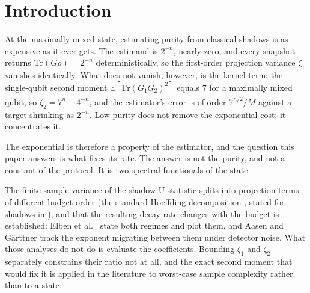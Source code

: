 \documentclass[a4paper,superscriptaddress,nofootinbib,onecolumn,nopdfoutputerror]{quantumarticle}
\begin{document}
\maketitle

\hypertarget{introduction}{%
\section{Introduction}\label{introduction}}

At the maximally mixed state, estimating purity from classical shadows is as expensive as it ever
gets. The estimand is \(2^{-n}\), nearly zero, and every snapshot returns
\(\mathrm{Tr}(G\rho) = 2^{-n}\) deterministically, so the first-order projection variance
\(\zeta_1\) vanishes identically. What does not vanish, however, is the kernel term: the
single-qubit second moment \(\mathbb{E}[\mathrm{Tr}(G_1G_2)^2]\) equals \(7\) for a maximally
mixed qubit, so
\(\zeta_2 = 7^n - 4^{-n}\), and the estimator's error is of order \(7^{n/2}/M\) against a target
shrinking as \(2^{-n}\). Low purity does not remove the exponential cost; it concentrates it.

The exponential is therefore a property of the estimator, and the question this paper answers is
what fixes its rate. The answer is not the purity, and not a constant of the protocol. It is two
spectral functionals of the state.

The finite-sample variance of the shadow U-statistic splits into projection terms of different
budget order (the standard Hoeffding decomposition \cite{hoeffding1948, serfling1980}, stated
for shadows in \cite{huang2020shadows}), and that the resulting decay rate changes with the
budget is established: Elben et al.~\cite{elben2020mixed} state both regimes and plot them, and
Aasen and G\"arttner \cite{aasen2026limitations} track the exponent migrating between them under
detector noise. What those analyses do not do is evaluate the coefficients. Bounding \(\zeta_1\)
and \(\zeta_2\) separately constrains their ratio not at all, and the exact second moment that
would fix it is applied in the literature to worst-case sample complexity rather than to a state.
\end{document}
